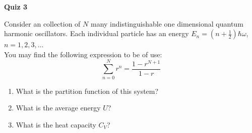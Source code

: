 \documentclass{article}
\begin{document}
\fancyfoot[C]{\thepage}
\vspace*{0cm}
\begin{center}
	{\LARGE \textbf{Quiz 3}}\\
	\vspace{.25cm}
\end{center}
Consider an collection of $N$ many indistinguishable one dimensional quantum harmonic oscillators. Each individual particle has an energy $E_n=(n+\frac{1}{2})\hbar\omega$, $n=1,2,3,\ldots$\\
You may find the following expression to be of use:
\begin{equation*}
	\sum_{n=0}^{N}r^n=\frac{1-r^{N+1}}{1-r}
\end{equation*}

\begin{enumerate}
	\item What is the partition function of this system?
	\item What is the average energy $U$?
	\item What is the heat capacity $C_V$?
\end{enumerate}
\end{document}
